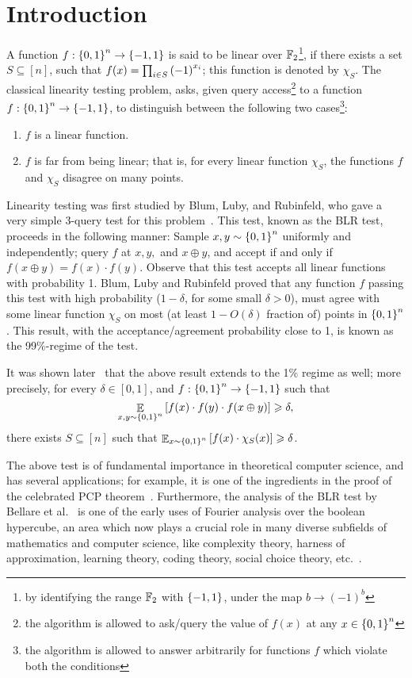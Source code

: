 \section{Introduction}

A function $f:\left\{ 0,1 \right\}^n\to \left\{ -1,1 \right\}$ is said to be linear over $\mathbb{F}_2$\footnote{by identifying the range $\mathbb{F}_2$ with $\left\{ -1,1 \right\}$, under the map $b\to (-1)^b$}, if there exists a set $S\subseteq [n]$, such that $f(x) = \prod_{i\in S} \left( -1 \right)^{x_i}$; this function is denoted by $\chi_S$.
The classical linearity testing problem, asks, given query access\footnote{the algorithm is allowed to ask/query the value of $f(x)$ at any $x\in \left\{ 0,1 \right\}^n$} to a function $f:\left\{ 0,1 \right\}^n\to \left\{ -1,1 \right\}$, to distinguish between the following two cases\footnote{the algorithm is allowed to answer arbitrarily for functions $f$ which violate both the conditions}:
\begin{enumerate}
	\item $f$ is a linear function.
	\item $f$ is far from being linear; that is, for every linear function $\chi_S$, the functions $f$ and $\chi_S$ disagree on many points.
\end{enumerate}

Linearity testing was first studied by Blum, Luby, and Rubinfeld, who gave a very simple 3-query test for this problem~\cite{BLR93}.
This test, known as the BLR test, proceeds in the following manner: Sample $x, y \sim \left\{ 0,1 \right\}^n$ uniformly and independently; query $f$ at $x, y,$ and $x\oplus y$, and accept if and only if $f(x\oplus y)=f(x)\cdot f(y)$.
Observe that this test accepts all linear functions with probability 1.
Blum, Luby and Rubinfeld proved that any function $f$ passing this test with high probability ($1-\delta$, for some small $\delta>0$), must agree with some linear function $\chi_S$ on most (at least $1-O(\delta)$ fraction of) points in $\left\{ 0,1 \right\}^n$.
This result, with the acceptance/agreement probability close to 1, is known as the 99\%-regime of the test.

It was shown later~\cite{BCHKS96, KLX10} that the above result extends to the 1\% regime as well; more precisely, for every $\delta\in [0,1]$, and $f:\left\{ 0,1 \right\}^n\to \left\{ -1,1 \right\}$ such that 
\[\mathop{\mathbb{E}}_{x,y\sim\left\{ 0,1 \right\}^n}\left[ f(x)\cdot f(y)\cdot f(x\oplus y) \right] \geqslant \delta,\]
there exists $S\subseteq [n]$ such that $\mathop{\mathbb{E}}_{x\sim \left\{ 0,1 \right\}^n}\left[ f(x)\cdot\chi_S(x) \right] \geqslant \delta$. 

The above test is of fundamental importance in theoretical computer science, and has several applications; for example, it is one of the ingredients in the proof of the celebrated PCP theorem~\cite{FGLSS96, AS98, ALMSS98}.
Furthermore, the analysis of the BLR test by Bellare et al.~\cite{BCHKS96} is one of the early uses of Fourier analysis over the boolean hypercube, an area which now plays a crucial role in many diverse subfields of mathematics and computer science, like complexity theory, harness of approximation, learning theory, coding theory, social choice theory, etc.~\cite{Don14}.

